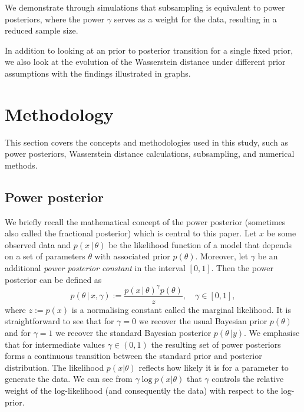 \documentclass[12pt]{article}
\begin{document}
We demonstrate through simulations that subsampling is equivalent to power posteriors, where the power $\gamma$ serves as a weight for the data, resulting in a reduced sample size.

In addition to looking at an prior to posterior transition for a single fixed prior, we also look at the evolution of the Wasserstein distance under different prior assumptions with the findings illustrated in graphs. 

\section{Methodology}

This section covers the concepts and methodologies used in this study, such as power posteriors, Wasserstein distance calculations, subsampling, and numerical methods.
	
\subsection{Power posterior}
We briefly recall the mathematical concept of the power posterior (sometimes
also called the fractional posterior) which is central to this paper. Let $x$
be some observed data and $p(x\, | \, \theta)$ be the likelihood function of a
model that depends on a set of parameters $\theta$ with associated prior
$p(\theta)$. Moreover, let $\gamma$ be an additional \emph{power posterior
constant} in the interval $[0, 1]$. Then the power posterior
\citep{friel2008marginal} can be defined as
\begin{equation}
\label{eq:pow_pos}
p(\theta \, | \, x,\gamma) := \frac{p(x \, | \, \theta)^\gamma p(\theta)}{z}, \quad \gamma \in [0, 1],
\end{equation}
where $z := p(x)$ is a normalising constant called the marginal likelihood. It
is straightforward to see that for $\gamma = 0$ we recover the usual Bayesian
prior $p(\theta)$ and for $\gamma = 1$ we recover the standard Bayesian
posterior $p(\theta \, | y)$. We emphasise that for intermediate values $\gamma
\in (0, 1)$ the resulting set of power posteriors forms a continuous
transition between the standard prior and posterior distribution. The likelihood  $p(x|\theta)$ reflects how likely it is for a parameter to generate the data. We can see from $\gamma \log p(x|\theta)$ that $\gamma$ 
controls the relative weight of the log-likelihood (and consequently the data) with respect to the log-prior.
\end{document}
